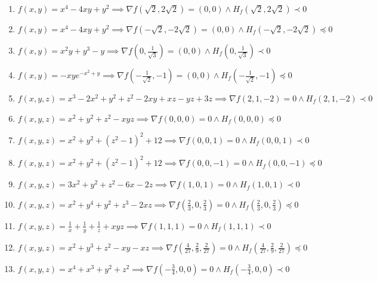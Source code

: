 \documentclass[11pt,a4paper]{article}
\begin{document}
\begin{enumerate}
\item $\displaystyle f(x, y) = x^{4} - 4xy + y^{2} \implies \nabla f\left( \sqrt{2}, 2\sqrt{2} \right) = (0, 0) \land H_{f}\left( \sqrt{2}, 2\sqrt{2} \right) \prec 0$
\item $\displaystyle f(x, y) = x^{4} - 4xy + y^{2} \implies \nabla f\left( -\sqrt{2}, -2\sqrt{2} \right) = (0, 0) \land H_{f}\left( -\sqrt{2}, -2\sqrt{2} \right) \preceq 0$
\item $\displaystyle f(x, y) = x^{2} y + y^{3} - y \implies \nabla f\left( 0, \frac{1}{\sqrt{3}} \right) = (0, 0) \land H_{f}\left( 0, \frac{1}{\sqrt{3}} \right) \prec 0$
\item $\displaystyle f(x, y) = -xy e^{-x^{2} + y} \implies \nabla f\left( -\frac{1}{\sqrt{2}}, -1 \right) = (0, 0) \land H_{f}\left( -\frac{1}{\sqrt{2}}, -1 \right) \preceq 0$
\item $\displaystyle f(x, y, z) = x^{3} - 2x^{2} + y^{2} + z^{2} - 2xy + xz - yz + 3z \implies \nabla f(2, 1, -2) = 0 \land H_{f}(2, 1, -2) \prec 0$
\item $\displaystyle f(x, y, z) = x^{2} + y^{2} + z^{2} - xyz \implies \nabla f(0, 0, 0) = 0 \land H_{f}(0, 0, 0) \preceq 0$
\item $\displaystyle f(x, y, z) = x^{2} + y^{2} + (z^{2} - 1)^{2} + 12 \implies \nabla f(0, 0, 1) = 0 \land H_{f}(0, 0, 1) \prec 0$
\item $\displaystyle f(x, y, z) = x^{2} + y^{2} + (z^{2} - 1)^{2} + 12 \implies \nabla f(0, 0, -1) = 0 \land H_{f}(0, 0, -1) \preceq 0$
\item $\displaystyle f(x, y, z) = 3x^{2} + y^{2} + z^{2} - 6x - 2z \implies \nabla f(1, 0, 1) = 0 \land H_{f}(1, 0, 1) \prec 0$
\item $\displaystyle f(x, y, z) = x^{2} + y^{4} + y^{2} + z^{3} - 2xz \implies \nabla f\left( \frac{2}{3}, 0, \frac{2}{3} \right) = 0 \land H_{f}\left( \frac{2}{3}, 0, \frac{2}{3} \right) \preceq 0$
\item $\displaystyle f(x, y, z) = \frac{1}{x} + \frac{1}{y} + \frac{1}{z} + xyz \implies \nabla f(1, 1, 1) = 0 \land H_{f}(1, 1, 1) \prec 0$
\item $\displaystyle f(x, y, z) = x^{2} + y^{3} + z^{2} - xy - xz \implies \nabla f\left( \frac{4}{27}, \frac{2}{9}, \frac{2}{27} \right) = 0 \land H_{f}\left( \frac{4}{27}, \frac{2}{9}, \frac{2}{27} \right) \preceq 0$
\item $\displaystyle f(x, y, z) = x^{4} + x^{3} + y^{2} + z^{2} \implies \nabla f\left( -\frac{3}{4}, 0, 0 \right) = 0 \land H_{f}\left( -\frac{3}{4}, 0, 0 \right) \prec 0$

\end{enumerate}
\end{document}
